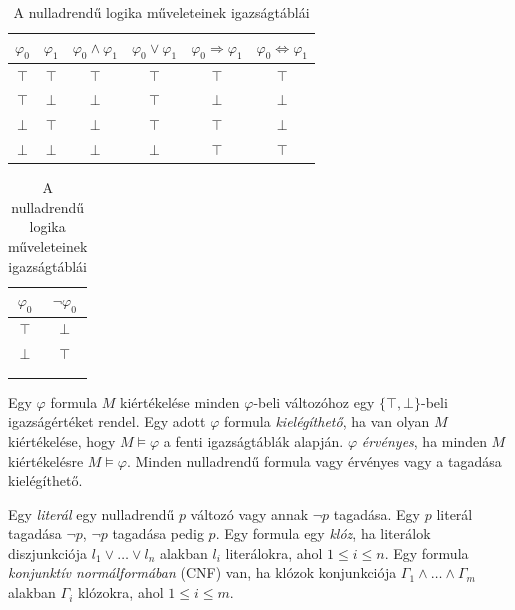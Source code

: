 \begin{table}[t]
\centering
    \begin{minipage}[b]{0.59\textwidth}%
        \centering
        \begin{tabular}{ c|c||c|c|c|c } 
         $\varphi_0$ & $\varphi_1$ & $\varphi_0 \wedge \varphi_1$ & $\varphi_0 \vee \varphi_1$ & $\varphi_0 \Rightarrow \varphi_1$ &  $\varphi_0 \Leftrightarrow \varphi_1$\\ 
         \hline
         $\top$ & $\top$ & $\top$ & $\top$ & $\top$ & $\top$ \\ 
         $\top$ & $\bot$ & $\bot$ & $\top$ & $\bot$ & $\bot$ \\ 
         $\bot$ & $\top$ & $\bot$ & $\top$ & $\top$ & $\bot$ \\ 
         $\bot$ & $\bot$ & $\bot$ & $\bot$ & $\top$ & $\top$ 
        \end{tabular}
        \label{table:logika-ketop-igazsagtabla}
    \end{minipage}%
    \hspace{0.01\textwidth}%
    \begin{minipage}[b]{0.3\textwidth}%
        \centering
        \begin{tabular}{ c||c } 
         $\varphi_0$ & $\neg \varphi_0$  \\ 
         \hline
         $\top$ & $\bot$ \\ 
         $\bot$ & $\top$ \\
         \multicolumn{2}{c}{} \\
         \multicolumn{2}{c}{} \\
        \end{tabular}
        \label{table:logika-neg-igazsagtabla}
    \end{minipage}%
    \caption{A nulladrendű logika műveleteinek igazságtáblái}
    \label{tab:my_label}
\end{table}

Egy $\varphi$ formula $M$ kiértékelése minden $\varphi$-beli változóhoz egy $\{\top,\bot\}$-beli igazságértéket rendel. Egy adott $\varphi$ formula \emph{kielégíthető}, ha van olyan $M$ kiértékelése, hogy $M \models \varphi$ a fenti igazságtáblák alapján. $\varphi$ \emph{érvényes}, ha minden $M$ kiértékelésre $M \models \varphi$. Minden nulladrendű formula vagy érvényes vagy a tagadása kielégíthető.

Egy \emph{literál} egy nulladrendű $p$ változó vagy annak $\neg p$ tagadása. Egy $p$ literál tagadása $\neg p$, $\neg p$ tagadása pedig $p$. Egy formula egy \emph{klóz}, ha literálok diszjunkciója $l_1 \vee \dots \vee l_n$ alakban $l_i$ literálokra, ahol $1 \leq i \leq n$. Egy formula \emph{konjunktív normálformában} (CNF) van, ha klózok konjunkciója $\Gamma_1 \wedge \dots \wedge \Gamma_m$ alakban $\Gamma_i$ klózokra, ahol $1 \leq i \leq m$.

